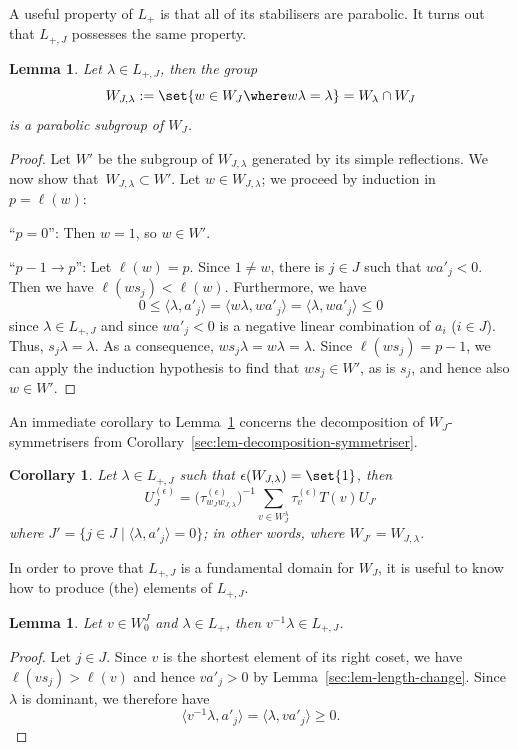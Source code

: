 \documentclass[10pt,a4paper]{amsart}
\newtheorem{Lemma}[Theorem]{Lemma}
\newtheorem{Corollary}[Theorem]{Corollary}
\theoremstyle{definition}
\numberwithin{equation}{section}
\begin{document}
A useful property of $L_+$ is that all of its stabilisers are parabolic.
It turns out that $L_{+,J}$ possesses the same property.
\begin{Lemma}\label{sec:lem-J-stabiliser-parabolic}
 Let $\lambda\in L_{+,J}$, then the group
 \[
 W_{J,\lambda} := \set{w\in W_J\where w\lambda=\lambda}
 = W_\lambda\cap W_J
 \]
 is a parabolic subgroup of $W_J$.
\end{Lemma}
\begin{proof}
 Let $W'$ be the subgroup of $W_{J,\lambda}$ generated by its simple reflections. We now show
 that~${W_{J,\lambda}\subset W'}$. Let $w\in W_{J,\lambda}$; we proceed by induction in $p=\ell(w)$:

``$p=0$'': Then $w=1$, so $w\in W'$.

``$p-1\to p$'': Let $\ell(w)=p$. Since $1\ne w$, there is $j\in J$ such that
 $wa'_j<0$. Then we have $\ell(ws_j)<\ell(w)$. Furthermore, we have
 \[
 0 \le \langle \lambda, a'_j\rangle
 = \langle w\lambda, wa'_j\rangle
 = \langle \lambda, wa'_j\rangle \le 0
 \]
 since $\lambda\in L_{+,J}$ and since $wa'_j<0$ is a negative linear combination of
 $a_i$ ($i\in J$). Thus, $s_j\lambda=\lambda$.
 As a consequence, $ws_j\lambda = w\lambda=\lambda$. Since $\ell(ws_j)=p-1$,
 we can apply the induction hypothesis to find that $ws_j\in W'$, as is $s_j$, and
 hence also $w\in W'$.
\end{proof}

An immediate corollary to Lemma~\ref{sec:lem-J-stabiliser-parabolic} concerns the decomposition of
$W_J$-symmetrisers from Corollary~\ref{sec:lem-decomposition-symmetriser}.
\begin{Corollary}\label{sec:cor-decomposition-symmetriser}
 Let $\lambda\in L_{+,J}$ such that $\epsilon(W_{J,\lambda})=\set{1}$, then
 \[
 U^{(\epsilon)}_J = \bigl(\tau^{(\epsilon)}_{w_Jw_{J,\lambda}}\bigr)^{-1}\sum_{v\in W_J^\lambda} \tau^{(\epsilon)}_v
 T(v) U_{J'}
 \]
 where $J'=\{j\in J\mid \langle\lambda,a'_j\rangle=0\}$; in other words, where $W_{J'}=W_{J,\lambda}$.
\end{Corollary}

In order to prove that $L_{+,J}$ is a fundamental domain for $W_J$, it is useful
to know how to produce (the) elements of $L_{+,J}$.
\begin{Lemma}\label{sec:lem-obtain-J-dominant}
 Let $v\in W_0^J$ and $\lambda\in L_+$, then $v^{-1}\lambda\in L_{+,J}$.
\end{Lemma}
\begin{proof}
 Let $j\in J$. Since $v$ is the shortest element of its right coset, we have $\ell(vs_j)>\ell(v)$ and hence
 $va'_j>0$ by Lemma~\ref{sec:lem-length-change}. Since $\lambda$ is dominant, we therefore have
 \[
 \big\langle v^{-1}\lambda, a'_j\big\rangle
 = \langle \lambda, va'_j\rangle\ge0.\tag*{\qed}
 \]\renewcommand{\qed}{}
\end{proof}
\end{document}

